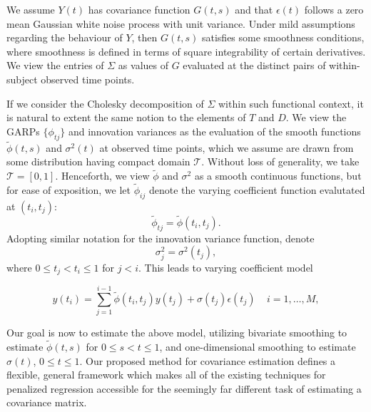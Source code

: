 \documentclass[12pt]{article}
\theoremstyle{definition}
\begin{document}
We assume $Y\left(t\right)$ has covariance function $G\left(t,s\right)$ and that $\epsilon\left(t\right)$ follows a zero mean Gaussian white noise process with unit variance. Under mild assumptions regarding the behaviour of $Y$, then $G\left(t,s\right)$ satisfies some smoothness conditions, where smoothness is defined in terms of square integrability of certain derivatives. We view the entries of $\Sigma$ as values of $G$ evaluated at the distinct pairs of within-subject observed time points. 
\bigskip


If we consider the Cholesky decomposition of $\Sigma$ within such functional context, it is natural to extent the same notion to the elements of $T$ and $D$. We view the GARPs $\lbrace \phi_{tj} \rbrace$ and innovation variances as the evaluation of the smooth functions $\tilde{\phi}\left(t,s\right)$ and $\sigma^2\left(t\right)$ at observed time points, which we assume  are drawn from some distribution having compact domain $\mathcal{T}$. Without loss of generality, we take $\mathcal{T} = \left[0,1\right]$. Henceforth, we view $\tilde{\phi}$ and $\sigma^2$ as a smooth continuous functions, but for ease of exposition, we let $\tilde{\phi}_{ij}$ denote the varying coefficient function evalutated at $\left(t_i,t_j\right)$: 
\[
\tilde{\phi}_{tj} = \tilde{\phi}\left(t_{i},t_{j}\right). 
\]
Adopting similar notation for the innovation variance function, denote
\[
\sigma_{j}^2 = \sigma^2\left(t_{j}\right),
\]
where $0 \le t_{j} < t_{i} \le 1$ for $j < i$. This leads to varying coefficient model

\begin{equation}  \label{eq:cholesky-regression-model-1} 
y\left(t_{i} \right)  = \sum_{j=1}^{i-1} \tilde{\phi}\left(t_{i} ,t_{j}\right) y\left(t_{j}\right) + \sigma\left(t_{j}\right)\epsilon\left({t_j}\right) \;\;\;\; i=1,\dots, M, 
\end{equation}
\noindent

Our goal is now to estimate the above model, utilizing bivariate smoothing to estimate $\tilde{\phi}\left(t,s\right)$ for $0 \le s < t \le 1$,  and one-dimensional smoothing to estimate $\sigma\left(t \right)$, $0 \le t \le 1$. Our proposed method for covariance estimation defines a flexible, general framework which makes all of the existing techniques for penalized regression accessible for the seemingly far different task of estimating a covariance matrix.

\bigskip
\end{document}
